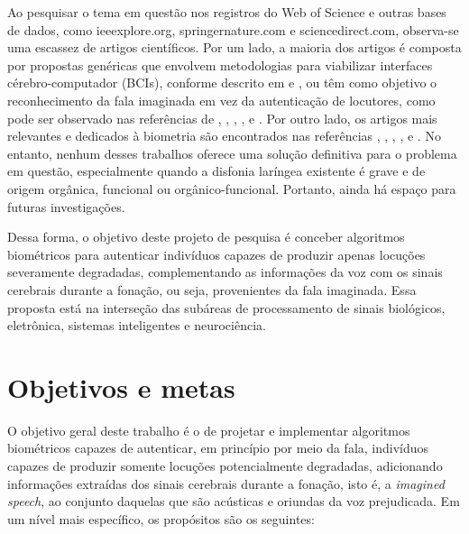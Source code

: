 \documentclass[a4paper,12pt,openright,oneside]{book}
\newenvironment{myenv}[1]
  {\begin{spacing}{#1}}
  {\end{spacing}}
\begin{document}
\begin{myenv}{1.5}
			\par Ao pesquisar o tema em questão nos registros do Web of Science e outras bases de dados, como ieeexplore.org, springernature.com e sciencedirect.com, observa-se uma escassez de artigos científicos. Por um lado, a maioria dos artigos é composta por propostas genéricas que envolvem metodologias para viabilizar interfaces cérebro-computador (BCIs), conforme descrito em \cite{rusnac2021eeg} e \cite{brigham2010imagined}, ou têm como objetivo o reconhecimento da fala imaginada em vez da autenticação de locutores, como pode ser observado nas referências de \cite{pawar2022wavelet}, \cite{cooney2021bimodal}, \cite{lopez2022state}, \cite{bakhshali2022investigating}, \cite{lee2021decoding} e \cite{tamm2020classification}. Por outro lado, os artigos mais relevantes e dedicados à biometria são encontrados nas referências \cite{moctezuma2019subjects}, \cite{moctezuma2018eeg}, \cite{jayarathne2016brainid}, \cite{jayarathne2017survey}, \cite{del2014electroencephalogram} e \cite{ruiz2016cerebre}. No entanto, nenhum desses trabalhos oferece uma solução definitiva para o problema em questão, especialmente quando a disfonia laríngea existente é grave e de origem orgânica, funcional ou orgânico-funcional. Portanto, ainda há espaço para futuras investigações.\newline
			
			\par Dessa forma, o objetivo deste projeto de pesquisa é conceber algoritmos biométricos para autenticar indivíduos capazes de produzir apenas locuções severamente degradadas, complementando as informações da voz com os sinais cerebrais durante a fonação, ou seja, provenientes da fala imaginada. Essa proposta está na interseção das subáreas de processamento de sinais biológicos, eletrônica, sistemas inteligentes e neurociência.
		\end{myenv}
	\chapter{Objetivos e metas}
		\label{ch:objetivosEMetas}
		\par O objetivo geral deste trabalho é o de projetar e implementar algoritmos biométricos capazes de autenticar, em princípio por meio da fala, indivíduos capazes de produzir somente locuções potencialmente degradadas, adicionando informações extraídas dos sinais cerebrais durante a fonação, isto é, a \textit{imagined speech}, ao conjunto daquelas que são acústicas e oriundas da voz prejudicada. Em um nível mais específico, os propósitos são os seguintes:
		
\end{document}

